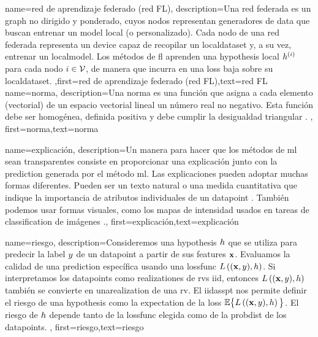 {name={red de aprendizaje federado (red FL)},
	description={Una red federada es un \gls{graph} no dirigido y ponderado, 
	cuyos nodos representan generadores de \gls{data} que buscan entrenar un \gls{model} local (o personalizado). 
	Cada nodo de una red federada representa un \gls{device} capaz de recopilar un \gls{localdataset}
	y, a su vez, entrenar un \gls{localmodel}. 
	Los métodos de \gls{fl} aprenden una \gls{hypothesis} local $h^{(i)}$ para
	cada nodo $i \in \mathcal{V}$, de manera que incurra en una \gls{loss} baja sobre su \gls{localdataset}.
	,first={red de aprendizaje federado (red FL)},text={red FL} 
} }
{name={norma},
	description={Una norma es una función que asigna a cada elemento (vectorial) de un espacio 
		vectorial lineal un número real no negativo. Esta función debe ser homogénea, definida positiva y debe 
		cumplir la desigualdad triangular \cite{HornMatAnalysis}. },
	first={norma},text={norma} 
}

{name={explicación},
	description={Un manera para hacer que los métodos de \gls{ml} sean transparentes consiste en  
		proporcionar una explicación junto con la \gls{prediction} generada por el método 
		\gls{ml}. Las explicaciones pueden adoptar muchas formas diferentes. Pueden ser un texto natural
		o una medida cuantitativa que indique la importancia de atributos individuales
		de un \gls{datapoint} \cite{Molnar2019}.
 		También podemos usar formas visuales, como los mapas de intensidad usados en tareas de \gls{classification} de imágenes \cite{GradCamPaper}.},
		first={explicación},text={explicación} 
}

{name={riesgo},
	description={Consideremos una \gls{hypothesis} $h$ que se utiliza para predecir la \gls{label} 
		$y$ de un \gls{datapoint} a partir de sus \gls{feature}s ${\bf x}$. Evaluamos 
		la calidad de una \gls{prediction} específica usando una \gls{lossfunc} $L\left(({\bf x},y),h \right)$. 
		Si interpretamos los  \gls{datapoint}s como \gls{realization}es de \gls{rv}s \gls{iid}, 
		entonces $L\left(({\bf x},y),h \right)$ también se convierte en una\gls{realization} 
		de una \gls{rv}. El \gls{iidasspt} nos permite definir el riesgo de una \gls{hypothesis} 
		como la \gls{expectation} de la \gls{loss} $\mathbb{E} \big\{L\left(({\bf x},y),h \right) \big\}$. 
		El riesgo de $h$ depende tanto de la \gls{lossfunc} elegida como de la \gls{probdist} de los \gls{datapoint}s.
		},
	first={riesgo},text={riesgo} 
}

